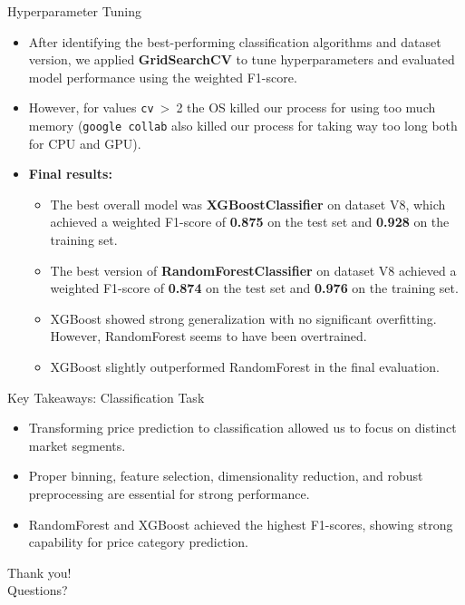 \documentclass{beamer}
\begin{document}
\begin{frame}{Hyperparameter Tuning}
    \begin{itemize}
        \item After identifying the best-performing classification algorithms
                and dataset version, we applied \textbf{GridSearchCV} to tune
                hyperparameters and evaluated model performance using the
                weighted F1-score.
        \item However, for values \texttt{cv}~\textgreater~2 the OS killed our
                process for using too much memory (\texttt{google collab} also
                killed our process for taking way too long both for CPU and
                GPU).
        \item \textbf{Final results:}
        \begin{itemize}
            \item The best overall model was \textbf{XGBoostClassifier} on
                    dataset V8, which achieved a weighted F1-score of
                    \textbf{0.875} on the test set and \textbf{0.928} on the
                    training set.
            \item The best version of \textbf{RandomForestClassifier} on
                    dataset V8 achieved a weighted F1-score of \textbf{0.874}
                    on the test set and \textbf{0.976} on the training set.
            \item XGBoost showed strong generalization with no significant
                overfitting. However, RandomForest seems to have been
                overtrained.
            \item XGBoost slightly outperformed RandomForest in the final
                evaluation.
        \end{itemize}
    \end{itemize}
\end{frame}

\begin{frame}{Key Takeaways: Classification Task}
        \begin{itemize}
                \item Transforming price prediction to classification allowed
                        us to focus on distinct market segments.
                \item Proper binning, feature selection, dimensionality
                        reduction, and robust preprocessing are essential for
                        strong performance.
                \item RandomForest and XGBoost achieved the highest F1-scores,
                        showing strong capability for price category
                        prediction.
        \end{itemize}
\end{frame}

\begin{frame}
        \centering
        \Huge
        Thank you! \\
        Questions?
\end{frame}
\end{document}
